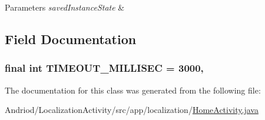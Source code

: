 \begin{DoxyParams}{Parameters}
{\em saved\-Instance\-State} & \\
\hline
\end{DoxyParams}


\subsection{Field Documentation}
\hypertarget{classapp_1_1localization_1_1_home_activity_af5858805af6e7dae14f55e3f4d0e0f9e}{
\subsubsection[{T\-I\-M\-E\-O\-U\-T\-\_\-\-M\-I\-L\-L\-I\-S\-E\-C}]{\setlength{\rightskip}{0pt plus 5cm}final int T\-I\-M\-E\-O\-U\-T\-\_\-\-M\-I\-L\-L\-I\-S\-E\-C = 3000\hspace{0.3cm}{\ttfamily [static]}, {\ttfamily [protected]}}}\label{classapp_1_1localization_1_1_home_activity_af5858805af6e7dae14f55e3f4d0e0f9e}


The documentation for this class was generated from the following file\-:\begin{DoxyCompactItemize}
\item 
Andriod/\-Localization\-Activity/src/app/localization/\hyperlink{_localization_activity_2src_2app_2localization_2_home_activity_8java}{Home\-Activity.\-java}\end{DoxyCompactItemize}
